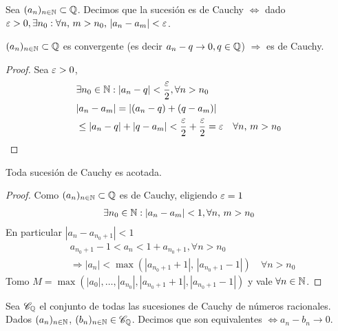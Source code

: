 \begin{definition}
  Sea \((a_n)_{n \in \mathbb{N}} \subset \mathbb{Q} \). Decimos que la sucesión es de Cauchy \(\iff \) dado \(\varepsilon > 0, \exists n_0 : \forall n\text{, }m > n_0\text{, } |a_n - a_m| < \varepsilon \).
\end{definition}

\begin{theorem}
  \((a_n)_{n \in \mathbb{N}} \subset \mathbb{Q} \) es convergente (es decir \(a_n - q \to 0, q \in \mathbb{Q} \)) \(\Rightarrow \) es de Cauchy.
  \begin{proof}
    Sea \(\varepsilon > 0\),
    \begin{align*}
       & \exists n_0 \in \mathbb{N} : |a_n - q| < \dfrac{\varepsilon}{2}, \forall n > n_0                                 \\
       & | a_n - a_m| = |(a_n - q) + (q - a_m)|                                                          \\
       & \leq |a_n - q| + |q - a_m| < \dfrac{\varepsilon}{2} + \dfrac{\varepsilon}{2} = \varepsilon \quad \forall n\text{, }m > n_0
    \end{align*}
  \end{proof}
\end{theorem}

\begin{theorem}
  Toda sucesión de Cauchy es acotada.
  \begin{proof}
    Como \((a_n)_{n \in \mathbb{N}} \subset \mathbb{Q} \) es de Cauchy, eligiendo \(\varepsilon = 1\) \begin{align*}
      \exists n_0 \in \mathbb{N} : |a_n - a_m| < 1, \forall n\text{, }m > n_0
    \end{align*}
    En particular \(|a_n - a_{n_0+1}| < 1\)
    \begin{align*}
       & a_{n_0+1} - 1 < a_n < 1 + a_{n_0+1}, \forall n > n_0                                    \\
       & \Rightarrow |a_n| < \max(|a_{n_0+1} + 1|\text{, } |a_{n_0+1} - 1|) \quad \forall n > n_0
    \end{align*}
    Tomo \(M = \max(|a_0|, \ldots, |a_{n_0}|, |a_{n_0+1} + 1|, |a_{n_0+1} - 1|)\) y vale \(\forall n \in \mathbb{N} \).
  \end{proof}
\end{theorem}

\begin{definition}
  Sea \(\mathscr{C}_{\mathbb{Q}} \) el conjunto de todas las sucesiones de Cauchy de números racionales. Dados \((a_n)_{n \in \mathbb{N}} \), \((b_n)_{n \in \mathbb{N}} \in \mathscr{C}_{\mathbb{Q}} \). Decimos que son equivalentes \(\iff a_n - b_n \to 0\).
\end{definition}

